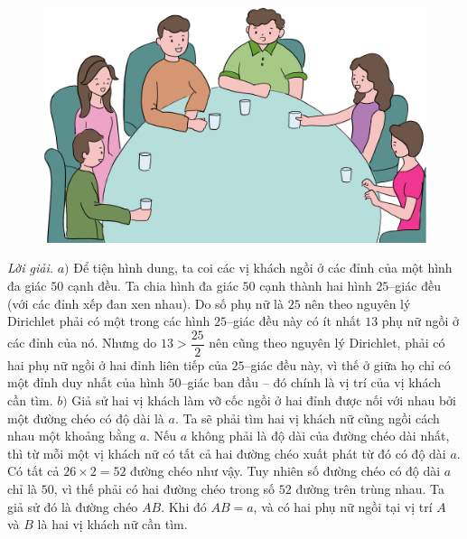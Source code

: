 \begin{multicols}{2}
\begin{figure}[H]
		\includegraphics[width=1\linewidth]{Pi10_ToanBi_Bai6}
		\vspace*{-15pt}
	\end{figure}
	\textit{Lời giải.} $a)$ Để tiện hình dung, ta coi các vị khách ngồi ở các đỉnh của một hình đa giác $50$ cạnh đều. Ta chia hình đa giác $50$ cạnh thành hai hình $25$--giác đều (với các đỉnh xếp đan xen nhau). Do số phụ nữ là $25$ nên theo nguyên lý Dirichlet phải có một trong các hình $25$--giác đều này có ít nhất $13$ phụ nữ ngồi ở các đỉnh của nó. Nhưng do $13>\dfrac{25}{2}$ nên cũng theo nguyên lý Dirichlet, phải có hai phụ nữ ngồi ở hai đỉnh liên tiếp của $25$--giác đều này, vì thế ở giữa họ chỉ có một đỉnh duy nhất của hình $50$--giác ban đầu -- đó chính là vị trí của vị khách cần tìm.
	\vskip 0.1cm
	$b)$ Giả sử hai vị khách làm vỡ cốc ngồi ở hai đỉnh được nối với nhau bởi một đường chéo có độ dài là $a$. Ta sẽ phải tìm hai vị khách nữ cũng ngồi cách nhau một khoảng bằng $a$.
	\vskip 0.1cm
	Nếu $a$ không phải là độ dài của đường chéo dài nhất, thì từ mỗi một vị khách nữ có tất cả hai đường chéo xuất phát từ đó có độ dài $a$. Có tất cả $26\times 2= 52$ đường chéo như vậy. Tuy nhiên số đường chéo có độ dài $a$ chỉ là $50$, vì thế phải có hai đường chéo trong số $52$ đường trên trùng nhau. Ta giả sử đó là đường chéo $AB$. Khi đó $AB=a$, và có hai phụ nữ ngồi tại vị trí $A$ và $B$ là hai vị khách nữ cần tìm.
\end{multicols}
\newpage
\begingroup
\thispagestyle{toancuabinone}
